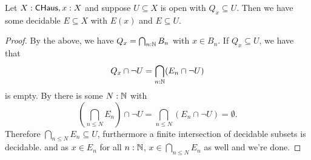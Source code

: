 \begin{lemma}
  Let $X:\mathsf{CHaus}, x:X$ and suppose $U\subseteq X$ is open with $Q_x\subseteq U$. 
  Then we have some decidable $E\subseteq X$ with $E(x)$ and $E\subseteq U$. 
\end{lemma}
\begin{proof}
  By the above, we have $Q_x = \bigcap_{n:\mathbb{N}}B_n$ with $x\in B_n$. 
  If $Q_x \subseteq U$, we have that 
  $$Q_x\cap \neg U = \bigcap_{n:\mathbb{N}} (E_n \cap \neg U)$$ is empty. 
  By  there is some $N:\mathbb{N}$ with 
  $$(\bigcap_{n\leq N} E_n )\cap \neg U  = \bigcap_{n\leq N} (E_n \cap \neg U) = \emptyset.$$
  Therefore $\bigcap_{n\leq N} E_n \subseteq U$, furthermore a finite intersection of decidable subsets is decidable. 
  and as $x\in E_n$ for all $n:\mathbb{N}$, $x\in \bigcap_{n\leq N} E_n$ as well and we're done. 
\end{proof}

